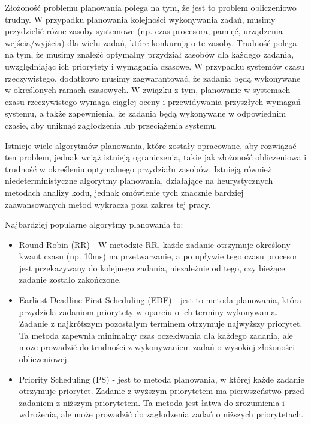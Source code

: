 Złożoność problemu planowania polega na tym, że jest to problem obliczeniowo trudny.
W przypadku planowania kolejności wykonywania zadań, musimy przydzielić różne zasoby systemowe (np. czas procesora, pamięć, urządzenia wejścia/wyjścia)
dla wielu zadań, które konkurują o te zasoby. Trudność polega na tym, że musimy znaleźć optymalny przydział zasobów dla każdego zadania,
uwzględniając ich priorytety i wymagania czasowe.
W przypadku systemów czasu rzeczywistego, dodatkowo musimy zagwarantować, że zadania będą wykonywane w określonych ramach czasowych.
W związku z tym, planowanie w systemach czasu rzeczywistego wymaga ciągłej oceny i przewidywania przyszłych wymagań systemu,
a także zapewnienia, że zadania będą wykonywane w odpowiednim czasie, aby uniknąć zagłodzenia lub przeciążenia systemu.

Istnieje wiele algorytmów planowania, które zostały opracowane, aby rozwiązać ten problem, jednak wciąż istnieją ograniczenia,
takie jak złożoność obliczeniowa i trudność w określeniu optymalnego przydziału zasobów. Istnieją również niedeterministyczne algorytmy planowania\cite{wang2021heuristic},
działające na heurystycznych metodach analizy kodu, jednak omówienie tych znacznie bardziej zaawansowanych metod wykracza poza zakres tej pracy.

Najbardziej popularne algorytmy planowania to:
\begin{itemize}
      \item Round Robin (RR) - W metodzie RR, każde zadanie otrzymuje określony kwant czasu (np. 10ms) na przetwarzanie,
            a po upływie tego czasu procesor jest przekazywany do kolejnego zadania, niezależnie od tego, czy bieżące zadanie zostało zakończone.
      \item Earliest Deadline First Scheduling (EDF) - jest to metoda planowania, która przydziela zadaniom priorytety w oparciu o ich terminy wykonywania.
            Zadanie z najkrótszym pozostałym terminem otrzymuje najwyższy priorytet. Ta metoda zapewnia minimalny czas oczekiwania dla każdego zadania,
            ale może prowadzić do trudności z wykonywaniem zadań o wysokiej złożoności obliczeniowej.
      \item Priority Scheduling (PS) - jest to metoda planowania, w której każde zadanie otrzymuje priorytet.
            Zadanie z wyższym priorytetem ma pierwszeństwo przed zadaniem z niższym priorytetem. Ta metoda jest łatwa do zrozumienia i wdrożenia,
            ale może prowadzić do zagłodzenia zadań o niższych priorytetach.
\end{itemize}


